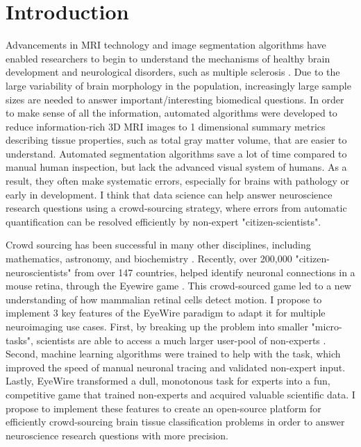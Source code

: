 \section{Introduction}

Advancements in MRI technology and image segmentation algorithms have enabled researchers to begin to understand the mechanisms of healthy brain development \cite{giedd1999brain} and neurological disorders, such as multiple sclerosis \cite{bakshi2008mri}. Due to the large variability of brain morphology in the population, increasingly large sample sizes are needed to answer important/interesting biomedical questions. In order to make sense of all the information, automated algorithms were developed to reduce information-rich 3D MRI images to 1 dimensional summary metrics describing tissue properties, such as total gray matter volume, that are easier to understand. Automated  segmentation algorithms save a lot of time compared to manual human inspection, but lack the advanced visual system of humans. As a result, they often make systematic errors, especially for brains with pathology or early in development. I think that data science can help answer neuroscience research questions using a crowd-sourcing strategy, where errors from automatic quantification can be resolved efficiently by non-expert "citizen-scientists".

Crowd sourcing has been successful in many other disciplines, including mathematics, astronomy, and biochemistry \cite{wiggins2011conservation}. Recently, over 200,000 "citizen-neuroscientists"  from over 147 countries, helped identify neuronal connections in a mouse retina, through the Eyewire game \cite{kim2014space}. This crowd-sourced game led to a new understanding of how mammalian retinal cells detect motion. I propose to implement 3 key features of the EyeWire paradigm to adapt it for multiple neuroimaging use cases. First, by breaking up the problem into smaller "micro-tasks", scientists are able to access a much larger user-pool of non-experts \cite{kittur2008crowdsourcing}. Second, machine learning algorithms were trained to help with the task, which improved the speed of manual neuronal tracing and validated non-expert input. Lastly, EyeWire transformed a dull, monotonous task for experts into a fun, competitive game that trained non-experts and acquired valuable scientific data. I propose to implement these features to create an open-source platform for efficiently crowd-sourcing brain tissue classification problems in order to answer neuroscience research questions with more precision.

